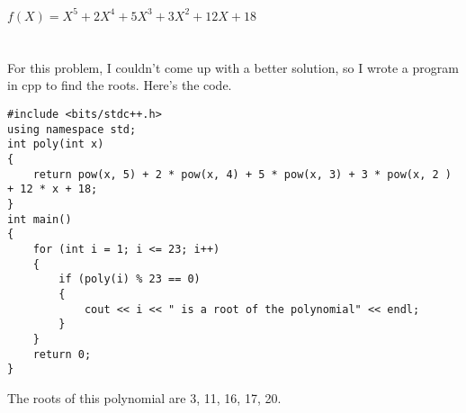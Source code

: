 \documentclass{article}
\begin{document}
\\ \hspace*{\fill} \\
$f(X) = X^5 + 2X^4 + 5X^3 + 3X^2 + 12X + 18$\\
\\ \hspace*{\fill} \\
For this problem, I couldn't come up with a better solution, so I wrote a program in cpp to find the roots. Here's the code.\\
\begin{lstlisting}
#include <bits/stdc++.h>
using namespace std;
int poly(int x)
{
    return pow(x, 5) + 2 * pow(x, 4) + 5 * pow(x, 3) + 3 * pow(x, 2 ) + 12 * x + 18;
}
int main()
{
    for (int i = 1; i <= 23; i++)
    {
        if (poly(i) % 23 == 0)
        {
            cout << i << " is a root of the polynomial" << endl;
        }
    }
    return 0;
}
\end{lstlisting}
The roots of this polynomial are 3, 11, 16, 17, 20.\\
\\ \hspace*{\fill} \\
\newpage
\end{document}
